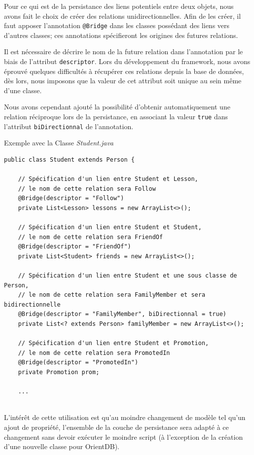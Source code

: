 \documentclass[a4paper,fleqn,12pt,oneside]{report}
\begin{document}
\newpage
Pour ce qui est de la persistance des liens potentiels entre deux objets, nous avons fait le choix de créer des relations unidirectionnelles. Afin de les créer, il faut apposer l'annotation \texttt{@Bridge} dans les classes possédant des liens vers d'autres classes; ces annotations spécifieront les origines des futures relations.

Il est nécessaire de décrire le nom de la future relation dans l'annotation par le biais de l'attribut \texttt{descriptor}. Lors du développement du framework, nous avons éprouvé quelques difficultés à récupérer ces relations depuis la base de données, dès lors, nous imposons que la valeur de cet attribut soit unique au sein même d'une classe. 

Nous avons cependant ajouté la possibilité d'obtenir automatiquement une relation réciproque lors de la persistance, en associant la valeur \texttt{true} dans l'attribut \texttt{biDirectionnal} de l'annotation. 

Exemple avec la Classe \textit{Student.java}

\begin{lstlisting}
public class Student extends Person {

    // Spécification d'un lien entre Student et Lesson, 
    // le nom de cette relation sera Follow
    @Bridge(descriptor = "Follow")
    private List<Lesson> lessons = new ArrayList<>();

    // Spécification d'un lien entre Student et Student, 
    // le nom de cette relation sera FriendOf
    @Bridge(descriptor = "FriendOf")
    private List<Student> friends = new ArrayList<>();
    
    // Spécification d'un lien entre Student et une sous classe de Person, 
    // le nom de cette relation sera FamilyMember et sera bidirectionnelle
    @Bridge(descriptor = "FamilyMember", biDirectionnal = true)
    private List<? extends Person> familyMember = new ArrayList<>();
    
    // Spécification d'un lien entre Student et Promotion, 
    // le nom de cette relation sera PromotedIn
    @Bridge(descriptor = "PromotedIn")
    private Promotion prom;
    
    ...
    
\end{lstlisting}

L'intérêt de cette utilisation est qu'au moindre changement de modèle tel qu'un ajout de propriété, l'ensemble de la couche de persistance sera adapté à ce changement sans devoir exécuter le moindre script (à l'exception de la création d'une nouvelle classe pour OrientDB).
\end{document}
